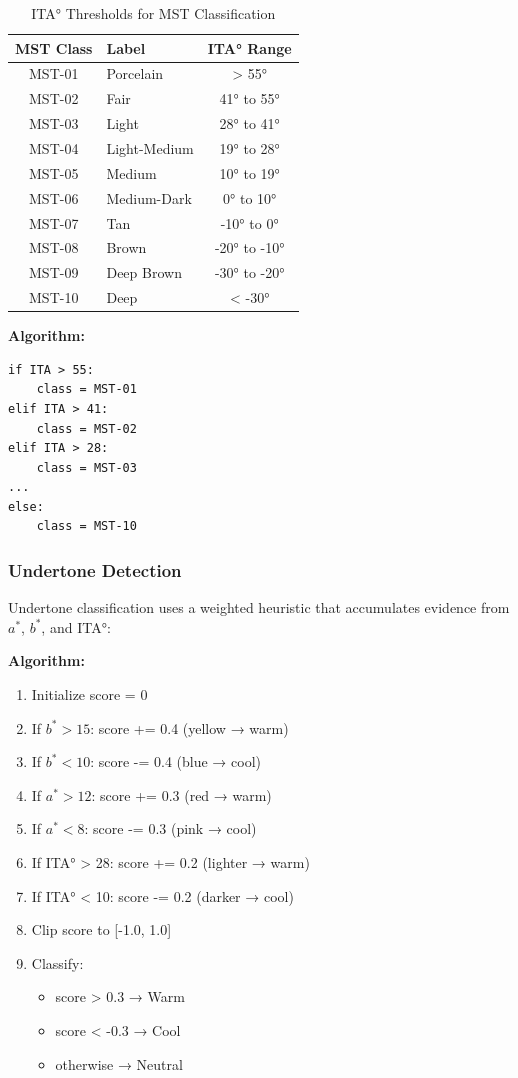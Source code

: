 \begin{table}[h]
\centering
\begin{tabular}{|c|l|c|}
\hline
\textbf{MST Class} & \textbf{Label} & \textbf{ITA° Range} \\
\hline
MST-01 & Porcelain & > 55° \\
MST-02 & Fair & 41° to 55° \\
MST-03 & Light & 28° to 41° \\
MST-04 & Light-Medium & 19° to 28° \\
MST-05 & Medium & 10° to 19° \\
MST-06 & Medium-Dark & 0° to 10° \\
MST-07 & Tan & -10° to 0° \\
MST-08 & Brown & -20° to -10° \\
MST-09 & Deep Brown & -30° to -20° \\
MST-10 & Deep & < -30° \\
\hline
\end{tabular}
\caption{ITA° Thresholds for MST Classification}
\end{table}

\textbf{Algorithm:}
\begin{verbatim}
if ITA > 55:
    class = MST-01
elif ITA > 41:
    class = MST-02
elif ITA > 28:
    class = MST-03
...
else:
    class = MST-10
\end{verbatim}

\subsubsection{Undertone Detection}

Undertone classification uses a weighted heuristic that accumulates evidence from $a^*$, $b^*$, and ITA°:

\textbf{Algorithm:}
\begin{enumerate}
    \item Initialize score = 0
    \item If $b^* > 15$: score += 0.4 (yellow → warm)
    \item If $b^* < 10$: score -= 0.4 (blue → cool)
    \item If $a^* > 12$: score += 0.3 (red → warm)
    \item If $a^* < 8$: score -= 0.3 (pink → cool)
    \item If ITA° > 28: score += 0.2 (lighter → warm)
    \item If ITA° < 10: score -= 0.2 (darker → cool)
    \item Clip score to [-1.0, 1.0]
    \item Classify:
    \begin{itemize}
        \item score > 0.3 → Warm
        \item score < -0.3 → Cool
        \item otherwise → Neutral
    \end{itemize}
\end{enumerate}

